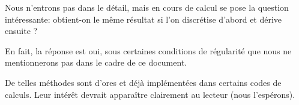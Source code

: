 Nous n'entrons pas dans le détail, mais en cours de calcul se pose la question intéressante:
obtient-on le même résultat si l'on discrétise d'abord et dérive ensuite ?

En fait, la réponse est oui, sous certaines conditions de régularité que nous ne mentionnerons
pas dans le cadre de ce document.

\medskip
{}

De telles méthodes sont d'ores et déjà implémentées dans certains codes de calculs.
Leur intérêt devrait apparaître clairement au lecteur (nous l'espérons).





